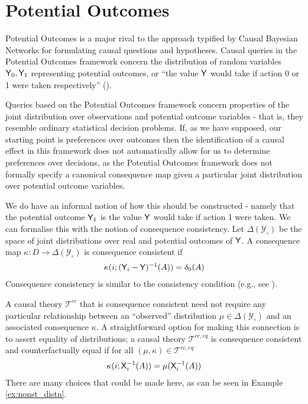 
\section{Potential Outcomes}

Potential Outcomes is a major rival to the approach typified by Causal Bayesian Networks for formulating causal questions and hypotheses. Causal queries in the Potential Outcomes framework concern the distribution of random variables $\mathsf{Y}_0, \mathsf{Y}_1$ representing potential outcomes, or ``the value $\mathsf{Y}$ would take if action 0 or 1 were taken respectively'' (\cite{angrist_mastering_2014}). 

Queries based on the Potential Outcomes framework concern properties of the joint distribution over observations and potential outcome variables - that is, they resemble ordinary statistical decision problems. If, as we have supposed, our starting point is preferences over outcomes then the identification of a causal effect in this framework does not automatically allow for us to determine preferences over decisions, as the Potential Outcomes framework does not formally specify a canonical consequence map given a particular joint distribution over potential outcome variables. 

We do have an informal notion of how this should be constructed - namely that the potential outcome $\mathsf{Y}_1$ is the value $\mathsf{Y}$ would take if action 1 were taken. We can formalise this with the notion of consequence consistency. Let $\Delta(\mathcal{Y}_\circ)$ be the space of joint distributions over real and potential outcomes of $\mathsf{Y}$. A consequence map $\kappa:D\to \Delta(\mathcal{Y}_\circ)$ is consequence consistent if
\begin{align}
    \kappa(i;(\mathsf{Y}_i-\mathsf{Y})^{-1}(A))=\delta_0(A) \label{eq:oc_consist}
\end{align} 
Consequence consistency is similar to the consistency condition (e.g., see \cite{richardson2013single}).

A causal theory $\mathscr{T}^{cc}$ that is consequence consistent need not require any particular relationship between an ``observed'' distribution $\mu\in \Delta(\mathcal{Y}_\circ)$ and an associated consequence $\kappa$. A straightforward option for making this connection is to assert equality of distributions; a causal theory $\mathscr{T}^{cc,eq}$ is consequence consistent and counterfactually equal if for all $(\mu,\kappa)\in\mathscr{T}^{cc,eq}$
\begin{align}
    \kappa(i;\mathsf{X}_i^{-1}(A))=\mu(\mathsf{X}_i^{-1}(A))
\end{align}
There are many choices that could be made here, as can be seen in Example \ref{ex:nonst_distn}.

